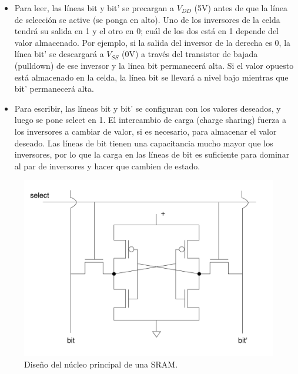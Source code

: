 \begin{itemize}
    \item Para leer, las líneas bit y bit’ se precargan a $V_{DD}$ (5V) antes de que la línea de selección se active (se ponga en alto). Uno de los inversores de la celda tendrá su salida en 1 y el otro en 0; cuál de los dos está en 1 depende del valor almacenado. Por ejemplo, si la salida del inversor de la derecha es 0, la línea bit’ se descargará a $V_{SS}$ (0V) a través del transistor de bajada (pulldown) de ese inversor y la línea bit permanecerá alta. Si el valor opuesto está almacenado en la celda, la línea bit se llevará a nivel bajo mientras que bit’ permanecerá alta.
    \item Para escribir, las líneas bit y bit’ se configuran con los valores deseados, y luego se pone select en 1. El intercambio de carga (charge sharing) fuerza a los inversores a cambiar de valor, si es necesario, para almacenar el valor deseado. Las líneas de bit tienen una capacitancia mucho mayor que los inversores, por lo que la carga en las líneas de bit es suficiente para dominar al par de inversores y hacer que cambien de estado.

\end{itemize}

\begin{figure}[H] \centering
    \includegraphics[width=0.6\linewidth]{Imagenes/02-Sram.png}
    \caption{Diseño del núcleo principal de una SRAM.}
    \label{Fig:02-SRAM}    
\end{figure}

\subsubsection{}

